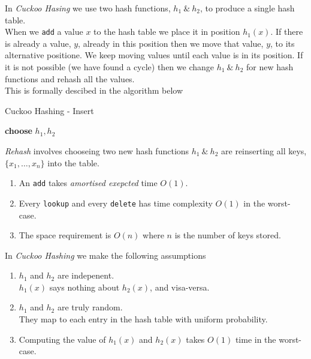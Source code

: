 \documentclass[11pt,a4paper]{article}
\begin{document}
In \textit{Cuckoo Hasing} we use two hash functions, $h_1\ \&\ h_2$, to produce a single hash table.\\
When we \lstinline!add! a value $x$ to the hash table we place it in position $h_1(x)$. If there is already a value, $y$, already in this position then we move that value, $y$, to its alternative positione. We keep moving values until each value is in its position. If it is not possible (\ie we have found a cycle) then we change $h_1\ \&\ h_2$ for new hash functions and rehash all the values.\\
This is formally descibed in the algorithm below\\
\begin{algorithm}[H]
\caption{Cuckoo Hashing - Insert}
\textbf{choose} $h_1,h_2$
\end{algorithm}
\nb \textit{Rehash} involves chooseing two new hash functions $h_1\ \&\ h_2$ are reinserting all keys, $\{x_1,\dots,x_n\}$ into the table.\\

\begin{enumerate}
	\item An \lstinline!add! takes \textit{amortised exepcted} time $O(1)$.
	\item Every \lstinline!lookup! and every \lstinline!delete! has time complexity $O(1)$ in the worst-case.
	\item The space requirement is $O(n)$ where $n$ is the number of keys stored.
\end{enumerate}

In \textit{Cuckoo Hashing} we make the following assumptions
\begin{enumerate}
	\item $h_1$ and $h_2$ are indepenent.\\
	\ie $h_1(x)$ says nothing about $h_2(x)$, and visa-versa.
	\item $h_1$ and $h_2$ are truly random.\\
	\ie They map to each entry in the hash table with uniform probability.
	\item Computing the value of $h_1(x)$ and $h_2(x)$ takes $O(1)$ time in the worst-case.
\end{enumerate}
\end{document}
